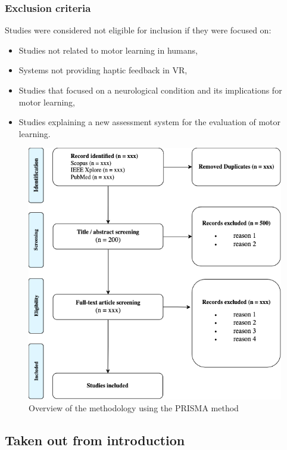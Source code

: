 \documentclass[conference]{IEEEtran}
\begin{document}
\subsubsection{Exclusion criteria}
Studies were considered not eligible for inclusion if they were focused on:
\begin{itemize}
    \item Studies not related to motor learning in humans,
    \item Systems not providing haptic feedback in VR,
    \item Studies that focused on a neurological condition and its implications for motor learning,
    \item Studies explaining a new assessment system for the evaluation of motor learning.
\end{itemize}



\begin{figure}[ht]
    \centering
    \includegraphics[width=\columnwidth]{prisma_overview.png} 
    \caption{Overview of the methodology using the PRISMA method}
    \label{fig:my_label}
\end{figure}


\subsection{Taken out from introduction}
\end{document}

